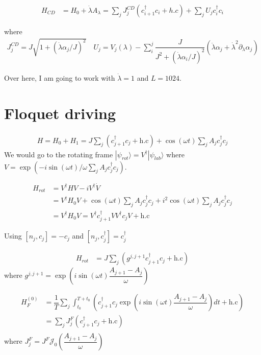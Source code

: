 \documentclass[11pt,a4paper]{article}
\begin{document}
\begin{align*}
H_{CD}&= H_0 + \dot{\lambda} A_{\lambda}=  \sum_j J^{CD}_j (c^{\dagger}_{i+1} c_i+ h.c) + \sum_j U_j  c^{\dagger}_{i} c_i
\end{align*}

where 
\begin{align*}
J^{CD}_j= J \sqrt{1 + (\dot{\lambda} \alpha_j/J)^2} \quad U_j = V_j( \lambda) - \sum_i^j \dfrac{J}{J^2 + (\dot{\lambda} \alpha_i/J)^2} (\ddot{\lambda} \alpha_j + \dot{\lambda}^2 \partial_{\lambda} \alpha_j)
\end{align*}

Over here, I am going to work with $\dot{\lambda}=1$ and $L=1024$.
\section{Floquet driving}

\begin{align*}
H = H_0 + H_1 = J\sum_j (c_{j+1}^{\dagger} c_j  + \mbox{h.c}) + \cos(\omega t) \sum_j A_j  c_j^{\dagger} c_j
\end{align*}
We would go to the rotating frame $|\psi_{rot} \rangle= V^{\dagger}|\psi_{lab} \rangle$
where $V=\exp(-i \sin(\omega t)/ \omega \sum_j A_j  c_j^{\dagger} c_j)$.

\begin{align*}
H_{rot}&= V^{\dagger} H V- i V^{\dagger} \dot{V}\\
&=V^{\dagger} H_0 V + \cos(\omega t) \sum_j A_j  c_j^{\dagger} c_j + i^2 \cos(\omega t) \sum_j A_j  c_j^{\dagger} c_j \\
&=V^{\dagger} H_0 V =V^{\dagger} c_{j+1}^{\dagger}V V^{\dagger} c_j V  + \mbox{h.c}
\end{align*}

Using $[n_j,c_j ]= -c_j$ and $[n_j,c_j^{\dagger} ]= c_j^{\dagger}$

\begin{align*}
H_{rot}&= J\sum_j   ( g^{j, j+1} c_{j+1}^{\dagger} c_j + \mbox{h.c})
\end{align*}
where $g^{j, j+1}= \exp\left(i \sin(\omega t) \dfrac{A_{j+1}- A_j}{\omega}\right)$



\begin{align*}
H_F^{(0)}&= \dfrac{1}{T}   \sum_j \int_{t_0}^{T+t_0}(c_{j+1}^{\dagger} c_j \exp\left(i \sin(\omega t) \dfrac{A_{j+1}- A_j}{\omega}\right) dt + \mbox{h.c})\\
&= \sum_j J_{j}^F (c_{j+1}^{\dagger} c_j + \mbox{h.c})\\
\end{align*}
where $J_{j}^F=J^F \mathcal{J}_0 \left(\dfrac{A_{j+1}- A_j}{\omega}\right)$
\end{document}
